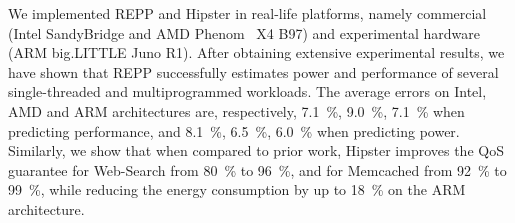    We implemented REPP and Hipster in real-life platforms, namely 
    commercial (Intel SandyBridge and AMD Phenom~ X4 B97) and experimental hardware
    (ARM big.LITTLE Juno R1).  After obtaining extensive experimental results, we have
    shown that REPP successfully estimates power and performance of several
    single-threaded and multiprogrammed workloads. The average errors on Intel, AMD and
    ARM architectures are, respectively, \SI{7.1}{\percent}, \SI{9.0}{\percent},
    \SI{7.1}{\percent} when predicting performance, and \SI{8.1}{\percent},
    \SI{6.5}{\percent}, \SI{6.0}{\percent} when predicting power.  Similarly, we show that
    when compared to prior work, Hipster improves the QoS guarantee for Web-Search from
    \SI{80}{\percent} to \SI{96}{\percent}, and for Memcached from \SI{92}{\percent} to
    \SI{99}{\percent}, while reducing the energy consumption by up to \SI{18}{\percent} on
    the ARM architecture.  
